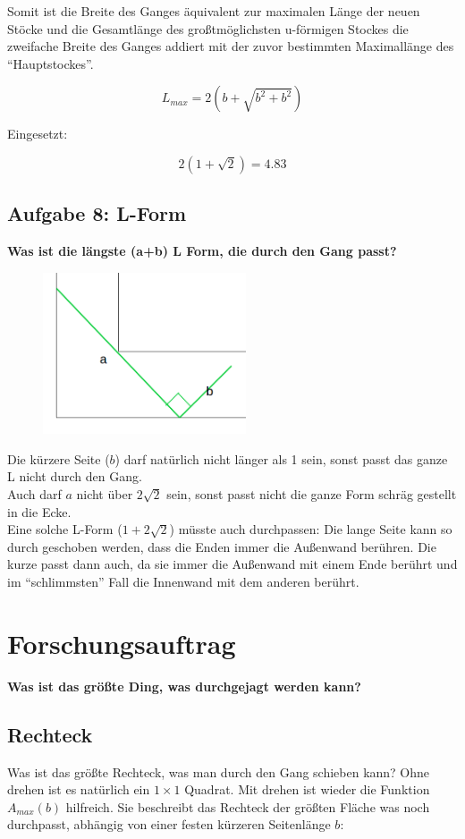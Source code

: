 \documentclass[a4paper,11pt]{article}
\begin{document}
Somit ist die Breite des Ganges äquivalent zur maximalen Länge der neuen Stöcke und die Gesamtlänge des großtmöglichsten u-förmigen Stockes die zweifache Breite des Ganges addiert mit der zuvor bestimmten Maximallänge des “Hauptstockes”.

\[ L_{max} = 2(b+\sqrt{b^2+b^2}) \]

Eingesetzt:

\[ 2(1+\sqrt{2})=4.83 \]

\subsection{Aufgabe 8: L-Form}
\textbf{Was ist die l\"angste (a+b) L Form, die durch den Gang passt?} \\

\begin{figure}[htbp] 
        \centering
        \includegraphics[width=6cm]{img/A8_1.png}
\end{figure}

Die kürzere Seite ($b$) darf natürlich nicht länger als 1 sein, sonst passt das ganze L nicht durch den Gang. \\
Auch darf $a$ nicht \"uber $2\sqrt{2}$ sein, sonst passt nicht die ganze Form schräg gestellt in die Ecke. \\
Eine solche L-Form ($1+2\sqrt{2}$) müsste auch durchpassen: Die lange Seite kann so durch geschoben werden, dass die Enden immer die Außenwand berühren. Die kurze passt dann auch, da sie immer die Außenwand mit einem Ende berührt und im ``schlimmsten'' Fall die Innenwand mit dem anderen berührt.

\section{Forschungsauftrag}
\textbf{Was ist das größte Ding, was durchgejagt werden kann?}

\subsection{Rechteck}
Was ist das größte Rechteck, was man durch den Gang schieben kann? Ohne drehen ist es natürlich ein $1\times 1$ Quadrat. Mit drehen ist wieder die Funktion $A_{max}(b)$ hilfreich. Sie beschreibt das Rechteck der größten Fläche was noch durchpasst, abhängig von einer festen kürzeren Seitenlänge $b$:
\end{document}
